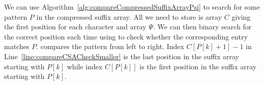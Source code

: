 We can use Algorithm~\ref{alg:compareCompressedSuffixArrayPsi} to search for some pattern $P$ in the compressed suffix array. All we need to store is array $C$ giving the first position for each character and array $\Psi$. We can then binary search for the correct position each time using  to check whether the corresponding entry matches $P$.  compares the pattern from left to right. Index $C[P[k] + 1] - 1$ in Line~\ref{line:compareCSACheckSmaller} is the last position in the suffix array starting with $P[k]$ while index $C[P[k]]$ is the first position in the suffix array starting with $P[k]$.
